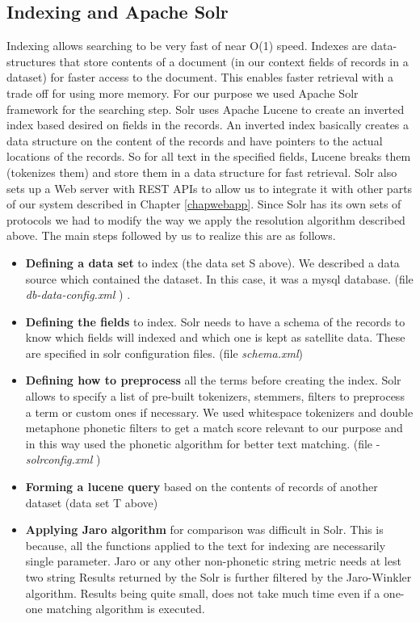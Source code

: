 \subsection{Indexing and Apache Solr}
        Indexing allows searching to be very fast of near O(1) speed. Indexes are data-structures that store contents of a document (in our context fields of records in a dataset) for faster access to the document. This enables faster retrieval with a trade off for using more memory. For our purpose we used Apache Solr framework \cite{solr}for the searching step. Solr uses Apache Lucene \cite{lucene} to create an inverted index based desired on fields in the records. An inverted index basically creates a data structure on the content of the records and have pointers to the actual locations of the records. So for all text in the specified fields, Lucene breaks them (tokenizes them) and store them in a data structure for fast retrieval.  Solr also sets up a  Web server with REST APIs to allow us to integrate it with other parts of our system described in Chapter \ref{chapwebapp}. 
        Since Solr has its own sets of protocols we had to modify the way we apply the resolution algorithm described above. The main steps followed by us to realize this are as follows.\cite{solrdocs} 
\begin{itemize}

        \item \textbf{ Defining a data set } to index  (the data set S above). We described a data source which contained the dataset. In this case, it was a mysql database. (file \emph{ db-data-config.xml }) .
        \item \textbf{ Defining the fields } to index. Solr needs to have a schema of the records to know which fields will indexed and which one is kept as satellite data. These are specified in solr configuration files. (file \emph{schema.xml})
        \item \textbf{ Defining how to preprocess } all the terms before creating the index. Solr allows to specify a list of pre-built tokenizers, stemmers, filters to preprocess a term or custom ones if necessary. We used whitespace tokenizers and double metaphone phonetic filters to get a match score relevant to our purpose and in this way used the phonetic algorithm for better text matching. (file - \emph{ solrconfig.xml })
        \item \textbf{ Forming a lucene query } based on the contents of records of another dataset (data set T above)
        \item \textbf{ Applying Jaro algorithm } for comparison was difficult in Solr. This is because, all the functions applied to the text for indexing are necessarily single parameter. Jaro or any other non-phonetic string metric needs at lest two string Results returned by the Solr is further filtered by the Jaro-Winkler algorithm. Results being quite small, does not take much time even if a one-one matching algorithm is executed. 

\end{itemize}
